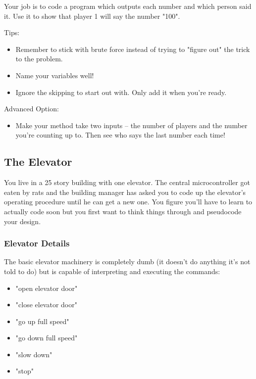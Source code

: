 \documentclass[11pt]{article}
\begin{document}
Your job is to code a program which outputs each number and which person said 
it. Use it to show that  player 1 will say the number "100".

Tips:

\begin{itemize}
\item Remember to stick with brute force instead of trying to "figure out" the 
trick to the problem.
\item Name your variables well!
\item Ignore the skipping to start out with. Only add it when you're ready.
\end{itemize}


Advanced Option:

\begin{itemize}
\item Make your method take two inputs -- the number of players and the number 
you're counting up to. Then see who says the last number each time!
\end{itemize}




\subsection{The Elevator}
\label{sec-12-1}

You live in a 25 story building with one elevator. The central 
microcontroller got eaten by rats and the building manager has asked you to 
code up the elevator's operating procedure until he can get a new one. You 
figure you'll have to learn to actually code soon but you first want to think
things through and pseudocode your design.

\subsubsection{Elevator Details}
\label{sec-12-1-1}

The basic elevator machinery is completely dumb (it doesn't do anything it's
not told to do) but is capable of interpreting and executing the commands:

\begin{itemize}
\item "open elevator door"
\item "close elevator door"
\item "go up full speed"
\item "go down full speed"
\item "slow down"
\item "stop"
\end{itemize}
\end{document}
